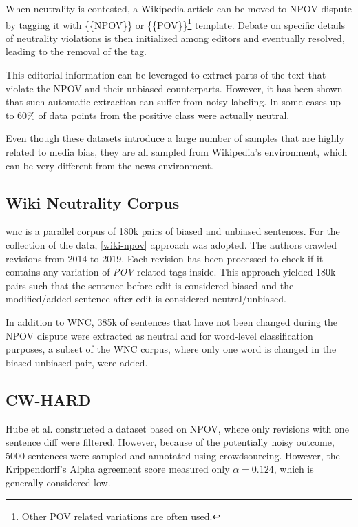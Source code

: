 When neutrality is contested, a Wikipedia article can be moved to NPOV dispute by tagging it with \{\{NPOV\}\} or \{\{POV\}\}\footnote{Other POV related variations are often used.} template. Debate on specific details of neutrality violations is then initialized among editors and eventually resolved, leading to the removal of the tag.

This editorial information can be leveraged to extract parts of the text that violate the NPOV and their unbiased counterparts. However, it has been shown \cite{hube2019neural,zhong-etal-2021-wikibias-detecting} that such automatic extraction can suffer from noisy labeling. In some cases \cite{hube2019neural} up to 60\% of data points from the positive class were actually neutral.

Even though these datasets introduce a large number of samples that are highly related to media bias, they are all sampled from Wikipedia's environment, which can be very different from the news environment.



\subsection{Wiki Neutrality Corpus}\label{wiki}
\Gls{wnc} \cite{pryzant2020automatically} is a parallel corpus of 180k pairs of biased and unbiased sentences. For the collection of the data, \ref{wiki-npov} approach was adopted. The authors crawled revisions from 2014 to 2019. Each revision has been processed to check if it contains any variation of \textit{POV} related tags inside. This approach yielded 180k pairs such that the sentence before edit is considered biased and the modified/added sentence after edit is considered neutral/unbiased.
    
In addition to WNC, 385k of sentences that have not been changed during the NPOV dispute were extracted as neutral and for word-level classification purposes, a subset of the WNC corpus, where only one word is changed in the biased-unbiased pair, were added.




\subsection{CW-HARD}
Hube et al. \cite{hube2019neural} constructed a dataset based on NPOV, where only revisions with one sentence diff were filtered. However, because of the potentially noisy outcome, 5000 sentences were sampled and annotated using crowdsourcing. However, the Krippendorff's Alpha agreement score measured only $\alpha = 0.124$, which is generally considered low. 

